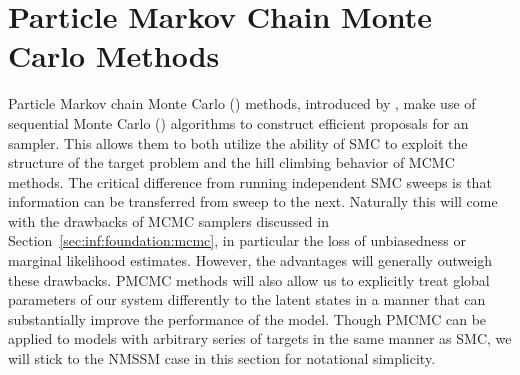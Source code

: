 
\section{Particle Markov Chain Monte Carlo Methods}
\label{sec:part:pmcmc}

Particle Markov chain Monte Carlo (\pmcmc) methods, introduced by \citet{andrieuDH2010}, make use of 
sequential Monte Carlo (\smc) algorithms \citep{gordon1993novel,doucet2001sequential} to construct 
efficient proposals for an \mcmc sampler. This allows them to both utilize the ability of SMC to
exploit the structure of the target problem and the hill climbing behavior of MCMC methods.
The critical difference from running independent SMC sweeps is that information can be transferred
from sweep to the next. 
Naturally this will come with the drawbacks of MCMC samplers
discussed in Section~\ref{sec:inf:foundation:mcmc}, in particular the loss of unbiasedness or marginal likelihood estimates.
However, the advantages will generally outweigh these drawbacks.  PMCMC methods will also allow us to explicitly
treat global parameters of our system differently to the latent states in a manner that can substantially improve
the performance of the model.
Though PMCMC can be applied to models with arbitrary series of targets in the same manner as SMC, we will stick
to the NMSSM case in this section for notational simplicity.

